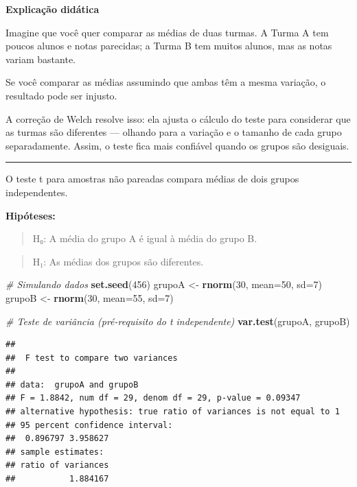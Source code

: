 \documentclass[
]{book}
\newenvironment{Shaded}{\begin{snugshade}}{\end{snugshade}}
\newcommand{\AttributeTok}[1]{\textcolor[rgb]{0.13,0.29,0.53}{#1}}
\newcommand{\CommentTok}[1]{\textcolor[rgb]{0.56,0.35,0.01}{\textit{#1}}}
\newcommand{\DecValTok}[1]{\textcolor[rgb]{0.00,0.00,0.81}{#1}}
\newcommand{\FunctionTok}[1]{\textcolor[rgb]{0.13,0.29,0.53}{\textbf{#1}}}
\newcommand{\NormalTok}[1]{#1}
\newcommand{\OtherTok}[1]{\textcolor[rgb]{0.56,0.35,0.01}{#1}}
\begin{document}
\textbf{Explicação didática}

Imagine que você quer comparar as médias de duas turmas. A Turma A tem poucos alunos e notas parecidas; a Turma B tem muitos alunos, mas as notas variam bastante.

Se você comparar as médias assumindo que ambas têm a mesma variação, o resultado pode ser injusto.

A correção de Welch resolve isso: ela ajusta o cálculo do teste para considerar que as turmas são diferentes --- olhando para a variação e o tamanho de cada grupo separadamente. Assim, o teste fica mais confiável quando os grupos são desiguais.

\begin{center}\rule{0.5\linewidth}{0.5pt}\end{center}

O teste t para amostras não pareadas compara médias de dois grupos independentes.

\textbf{Hipóteses:}

\begin{quote}
H₀: A média do grupo A é igual à média do grupo B.
\end{quote}

\begin{quote}
H₁: As médias dos grupos são diferentes.
\end{quote}

\begin{Shaded}
\begin{Highlighting}[]
\CommentTok{\# Simulando dados}
\FunctionTok{set.seed}\NormalTok{(}\DecValTok{456}\NormalTok{)}
\NormalTok{grupoA }\OtherTok{\textless{}{-}} \FunctionTok{rnorm}\NormalTok{(}\DecValTok{30}\NormalTok{, }\AttributeTok{mean=}\DecValTok{50}\NormalTok{, }\AttributeTok{sd=}\DecValTok{7}\NormalTok{)}
\NormalTok{grupoB }\OtherTok{\textless{}{-}} \FunctionTok{rnorm}\NormalTok{(}\DecValTok{30}\NormalTok{, }\AttributeTok{mean=}\DecValTok{55}\NormalTok{, }\AttributeTok{sd=}\DecValTok{7}\NormalTok{)}

\CommentTok{\# Teste de variância (pré{-}requisito do t independente)}
\FunctionTok{var.test}\NormalTok{(grupoA, grupoB)}
\end{Highlighting}
\end{Shaded}

\begin{verbatim}
## 
##  F test to compare two variances
## 
## data:  grupoA and grupoB
## F = 1.8842, num df = 29, denom df = 29, p-value = 0.09347
## alternative hypothesis: true ratio of variances is not equal to 1
## 95 percent confidence interval:
##  0.896797 3.958627
## sample estimates:
## ratio of variances 
##           1.884167
\end{verbatim}
\end{document}
